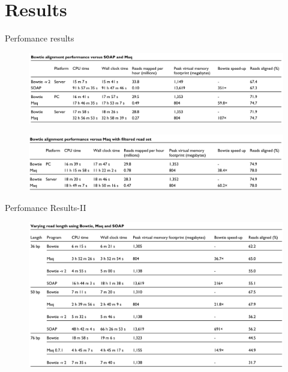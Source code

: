 \documentclass[mathserif]{beamer}
\begin{document}
\section{Results}
\begin{frame}{Perfomance results}
\begin{figure}
    \includegraphics[width=\textwidth]{media/tab1.png}
\end{figure}
\pause
\begin{figure}
    \includegraphics[width=\textwidth]{media/tab2.png}
\end{figure}
\end{frame}

\begin{frame}{Perfomance Results-II}
    \begin{figure}
        \includegraphics[width=\textwidth]{media/tab3.png}
    \end{figure}
\end{frame}
\end{document}
